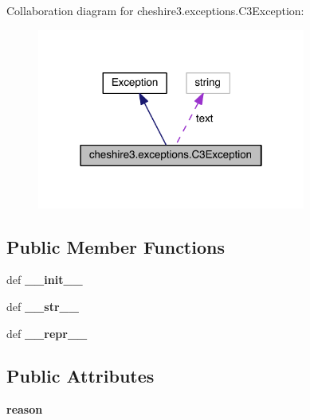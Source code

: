 Collaboration diagram for cheshire3.\-exceptions.\-C3\-Exception\-:
\nopagebreak
\begin{figure}[H]
\begin{center}
\leavevmode
\includegraphics[width=250pt]{classcheshire3_1_1exceptions_1_1_c3_exception__coll__graph}
\end{center}
\end{figure}
\subsection*{Public Member Functions}
\begin{DoxyCompactItemize}
\item 
\hypertarget{classcheshire3_1_1exceptions_1_1_c3_exception_a9404cda528df72a4e9742d242ba86867}{def {\bfseries \-\_\-\-\_\-init\-\_\-\-\_\-}}\label{classcheshire3_1_1exceptions_1_1_c3_exception_a9404cda528df72a4e9742d242ba86867}

\item 
\hypertarget{classcheshire3_1_1exceptions_1_1_c3_exception_a9a42b87af7a457cfc36b4e600f9ab454}{def {\bfseries \-\_\-\-\_\-str\-\_\-\-\_\-}}\label{classcheshire3_1_1exceptions_1_1_c3_exception_a9a42b87af7a457cfc36b4e600f9ab454}

\item 
\hypertarget{classcheshire3_1_1exceptions_1_1_c3_exception_ae53cb388e189060ef552e23f35f33291}{def {\bfseries \-\_\-\-\_\-repr\-\_\-\-\_\-}}\label{classcheshire3_1_1exceptions_1_1_c3_exception_ae53cb388e189060ef552e23f35f33291}

\end{DoxyCompactItemize}
\subsection*{Public Attributes}
\begin{DoxyCompactItemize}
\item 
\hypertarget{classcheshire3_1_1exceptions_1_1_c3_exception_a701c2413f17202d0fb5ebe4585120e3a}{{\bfseries reason}}\label{classcheshire3_1_1exceptions_1_1_c3_exception_a701c2413f17202d0fb5ebe4585120e3a}

\end{DoxyCompactItemize}
